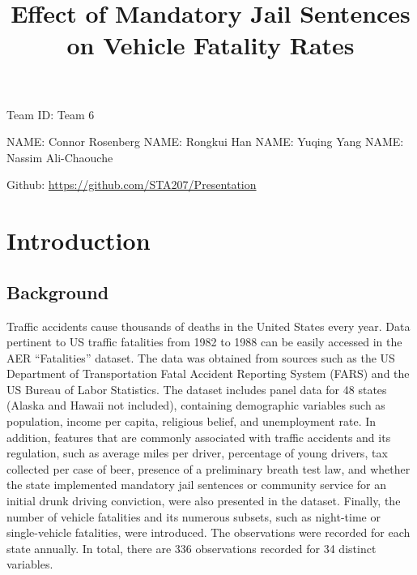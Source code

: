 \documentclass[]{article}
\title{Effect of Mandatory Jail Sentences on Vehicle Fatality Rates}
\author{}
\date{\vspace{-2.5em}}
\begin{document}
\maketitle

Team ID: Team 6

NAME: Connor Rosenberg
NAME: Rongkui Han
NAME: Yuqing Yang
NAME: Nassim Ali-Chaouche

Github: \url{https://github.com/STA207/Presentation}

\hypertarget{introduction}{%
\section{Introduction}\label{introduction}}

\hypertarget{background}{%
\subsection{Background}\label{background}}

Traffic accidents cause thousands of deaths in the United States every year. Data pertinent to US traffic fatalities from 1982 to 1988 can be easily accessed in the AER ``Fatalities'' dataset. The data was obtained from sources such as the US Department of Transportation Fatal Accident Reporting System (FARS) and the US Bureau of Labor Statistics. The dataset includes panel data for 48 states (Alaska and Hawaii not included), containing demographic variables such as population, income per capita, religious belief, and unemployment rate. In addition, features that are commonly associated with traffic accidents and its regulation, such as average miles per driver, percentage of young drivers, tax collected per case of beer, presence of a preliminary breath test law, and whether the state implemented mandatory jail sentences or community service for an initial drunk driving conviction, were also presented in the dataset. Finally, the number of vehicle fatalities and its numerous subsets, such as night-time or single-vehicle fatalities, were introduced. The observations were recorded for each state annually. In total, there are 336 observations recorded for 34 distinct variables.
\end{document}
